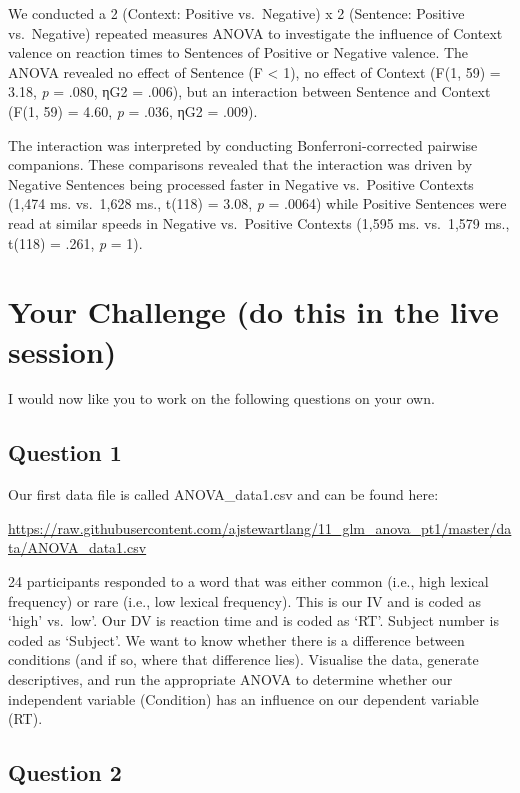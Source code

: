 \documentclass[
]{book}
\begin{document}
We conducted a 2 (Context: Positive vs.~Negative) x 2 (Sentence: Positive vs.~Negative) repeated measures ANOVA to investigate the influence of Context valence on reaction times to Sentences of Positive or Negative valence. The ANOVA revealed no effect of Sentence (F \textless{} 1), no effect of Context (F(1, 59) = 3.18, \emph{p} = .080, ηG2 = .006), but an interaction between Sentence and Context (F(1, 59) = 4.60, \emph{p} = .036, ηG2 = .009).

The interaction was interpreted by conducting Bonferroni-corrected pairwise companions. These comparisons revealed that the interaction was driven by Negative Sentences being processed faster in Negative vs.~Positive Contexts (1,474 ms. vs.~1,628 ms., t(118) = 3.08, \emph{p} = .0064) while Positive Sentences were read at similar speeds in Negative vs.~Positive Contexts (1,595 ms. vs.~1,579 ms., t(118) = .261, \emph{p} = 1).

\hypertarget{your-challenge-do-this-in-the-live-session-3}{%
\section{Your Challenge (do this in the live session)}\label{your-challenge-do-this-in-the-live-session-3}}

I would now like you to work on the following questions on your own.

\hypertarget{question-1}{%
\subsection{Question 1}\label{question-1}}

Our first data file is called ANOVA\_data1.csv and can be found here:

\url{https://raw.githubusercontent.com/ajstewartlang/11_glm_anova_pt1/master/data/ANOVA_data1.csv}

24 participants responded to a word that was either common (i.e., high lexical frequency) or rare (i.e., low lexical frequency). This is our IV and is coded as `high' vs.~low'. Our DV is reaction time and is coded as `RT'. Subject number is coded as `Subject'. We want to know whether there is a difference between conditions (and if so, where that difference lies). Visualise the data, generate descriptives, and run the appropriate ANOVA to determine whether our independent variable (Condition) has an influence on our dependent variable (RT).

\hypertarget{question-2}{%
\subsection{Question 2}\label{question-2}}
\end{document}

